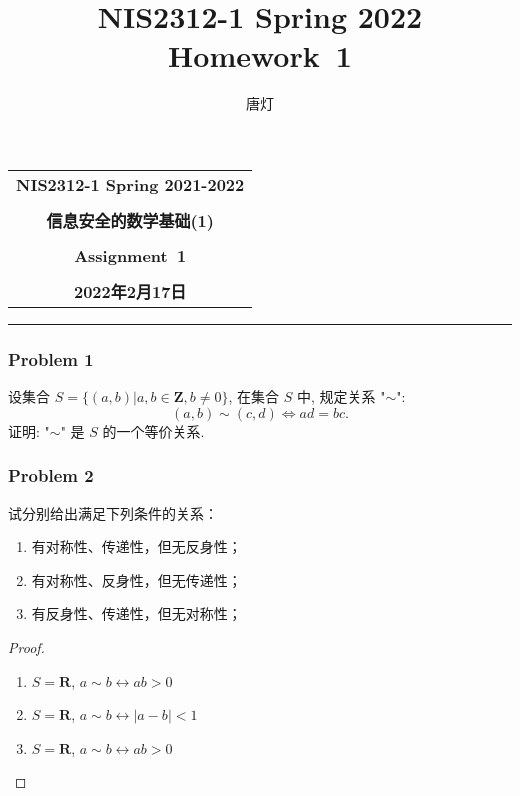 \documentclass[a4paper,12pt]{ctexart}
\title{NIS2312-1 Spring 2022 Homework~1}
\author{唐灯}
\newcommand{\Z}{\mathbf{Z}}
\newcommand{\R}{\mathbf{R}}
\begin{document}
  \begin{center}

  \vspace{-0.3in}
  \begin{tabular}{c}
    \textbf{\Large NIS2312-1 Spring 2021-2022} \\
    \textbf{\Large  } \\
    \textbf{\Large  信息安全的数学基础(1)} \\
    \textbf{\Large  } \\
    \textbf{\Large  Assignment~1} \\
    \textbf{\Large  } \\
    \textbf{\Large 2022年2月17日} \\
  \end{tabular}
  \end{center}
  \noindent
  \rule{\linewidth}{0.4pt}
  
\subsubsection*{Problem 1}
    设集合 $ S=\{(a,b)|a,b\in\Z,b\neq 0\}$,
    在集合 $ S $ 中, 规定关系 "$ \sim $":\[(a,b)\sim(c,d)\Leftrightarrow  ad=bc.\]
    证明: "$\sim$" 是 $ S $ 的一个等价关系.
\subsubsection*{Problem 2} 
    试分别给出满足下列条件的关系：
    \begin{enumerate}
        \item 有对称性、传递性，但无反身性；
        \item 有对称性、反身性，但无传递性；
        \item 有反身性、传递性，但无对称性；
    \end{enumerate}
    \begin{proof}
        \begin{enumerate}
            \item $ S=\R $, $ a\sim b\leftrightarrow ab>0 $
            \item $ S=\R $, $ a\sim b\leftrightarrow \left\lvert a-b\right\rvert <1 $
            \item $ S=\R $, $ a\sim b\leftrightarrow ab>0 $
        \end{enumerate}
    \end{proof}
\end{document}
